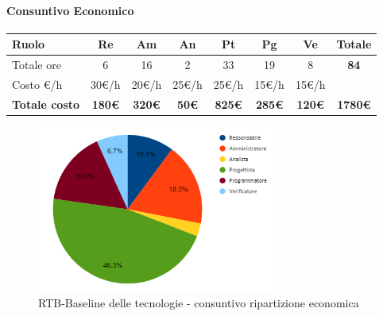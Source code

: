 \paragraph{Consuntivo Economico}
\begin{center}
	\renewcommand{\arraystretch}{1.8}
	\begin{tabular}{ |m{6em}|c|c|c|c|c|c|c| }
	\hline
	\textbf{Ruolo} & \textbf{Re} & \textbf{Am} &  \textbf{An} &  \textbf{Pt} &  \textbf{Pg} &  \textbf{Ve} &  \textbf{Totale}\\
    \hline
    Totale ore & 6 & 16 & 2 & 33 & 19 & 8 & \textbf{84}\\
    \hline
    Costo \euro/h & 30\euro/h & 20\euro/h & 25\euro/h & 25\euro/h & 15\euro/h & 15\euro/h & \\
    \hline
    \textbf{Totale costo} & \textbf{180\euro} & \textbf{320\euro} &  \textbf{50\euro} &  \textbf{825\euro} &  \textbf{285\euro} &  \textbf{120\euro} &  \textbf{1780\euro}\\
    \hline
	\end{tabular}
    \begin{figure}[H]
        \centering\includegraphics[width=0.7\textwidth, height=0.7\textheight, keepaspectratio]{images/consuntivo/RTB-tecnologico-costo.png}
        \caption{RTB-Baseline delle tecnologie - consuntivo ripartizione economica}
    \end{figure}
\end{center}


